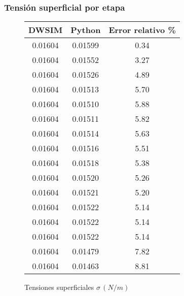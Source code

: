 \newpage

\subsubsection{Tensión superficial por etapa}
\begin{figure}[H]
    \centering
    \caption{Tensiones superficiales $\sigma \, (N/m)$ }
    \small
    \begin{tabular}{|c|c|c|}
        \hline
        \textbf{DWSIM} & \textbf{Python} & \textbf{Error relativo} \% \\
        \hline
        0.01604        & 0.01599         & 0.34                       \\
        \hline
        0.01604        & 0.01552         & 3.27                       \\
        \hline
        0.01604        & 0.01526         & 4.89                       \\
        \hline
        0.01604        & 0.01513         & 5.70                       \\
        \hline
        0.01604        & 0.01510         & 5.88                       \\
        \hline
        0.01604        & 0.01511         & 5.82                       \\
        \hline
        0.01604        & 0.01514         & 5.63                       \\
        \hline
        0.01604        & 0.01516         & 5.51                       \\
        \hline
        0.01604        & 0.01518         & 5.38                       \\
        \hline
        0.01604        & 0.01520         & 5.26                       \\
        \hline
        0.01604        & 0.01521         & 5.20                       \\
        \hline
        0.01604        & 0.01522         & 5.14                       \\
        \hline
        0.01604        & 0.01522         & 5.14                       \\
        \hline
        0.01604        & 0.01522         & 5.14                       \\
        \hline
        0.01604        & 0.01479         & 7.82                       \\
        \hline
        0.01604        & 0.01463         & 8.81                       \\

\end{tabular}
\end{figure}
